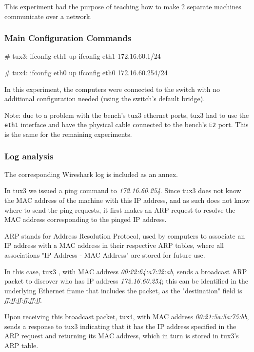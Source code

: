 This experiment had the purpose of teaching how to make 2 separate machines communicate over a network.

\subsubsection{Main Configuration Commands}

\begin{code-bash}
# tux3:
ifconfig eth1 up
ifconfig eth1 172.16.60.1/24

# tux4:
ifconfig eth0 up
ifconfig eth0 172.16.60.254/24

\end{code-bash}

In this experiment, the computers were connected to the switch with no additional configuration needed (using the switch's default bridge).

Note: due to a problem with the bench's tux3 ethernet ports, tux3 had to use the \lstinline{eth1} interface and have the physical cable connected to the bench's \lstinline{E2} port. This is the same for the remaining experiments.

\subsubsection{Log analysis}

The corresponding Wireshark log is included as an annex.

In tux3 we issued a ping command to \textit{172.16.60.254}.
Since tux3 does not know the MAC address of the machine with this IP address, and as such does not know where to send the ping requests, it first makes an ARP request to resolve the MAC address corresponding to the pinged IP address.

ARP stands for Address Resolution Protocol, used by computers to associate an IP address with a MAC address in their respective ARP tables, where all associations "IP Address - MAC Address" are stored for future use.

In this case, tux3 , with MAC address \textit{00:22:64:a7:32:ab}, sends a broadcast ARP packet to discover who has IP address \textit{172.16.60.254}; this can be identified in the underlying Ethernet frame that includes the packet, as the "destination" field is \textit{ff:ff:ff:ff:ff:ff}.

Upon receiving this broadcast packet, tux4, with MAC address \textit{00:21:5a:5a:75:bb}, sends a response to tux3 indicating that it has the IP address specified in the ARP request and returning its MAC address, which in turn is stored in tux3's ARP table.

